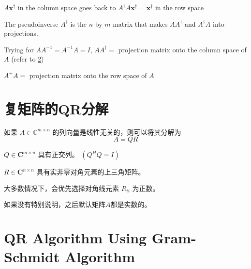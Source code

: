 \begin{FigureCenter}{$ A \boldsymbol{x}^{\dagger} $ in the column space goes back to $ A^{\dagger} A \boldsymbol{x}^{\dagger}=\boldsymbol{x}^{\dagger}$ in the row space}
\end{FigureCenter}


        

The pseudoinverse $ A^{\dagger} $ is the $ n $ by $ m $ matrix that makes $ A A^{\dagger} $ and $ A^{\dagger} A $ into projections. 

\begin{remark}
    Trying for $ A A^{-1}=A^{-1} A=I $, $ A A^{\dagger}= $ projection matrix onto the column space of $ A $ (refer to \ref{})

    $ A^{+} A= $ projection matrix onto the row space of $ A $
\end{remark}

\section{复矩阵的QR分解}

\begin{theorem}
    如果 $A \in \mathbb{C}^{m \times n}$ 的列向量是线性无关的，则可以将其分解为
$$
A=Q R
$$

$Q \in \boldsymbol{C}^{m \times n}$ 具有正交列。 $\left(Q^{H} Q=I\right)$

$R \in \boldsymbol{C}^{n \times n}$ 具有实非零对角元素的上三角矩阵。
\end{theorem}

大多数情况下，会优先选择对角线元素 $R_{i i}$ 为正数。

如果没有特别说明，之后默认矩阵$A$都是实数的。

\section{QR Algorithm Using Gram-Schmidt Algorithm}

